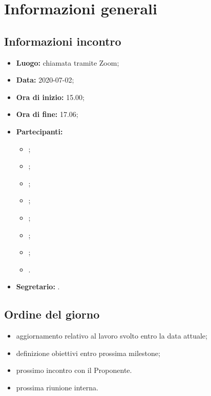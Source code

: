 \section{Informazioni generali}
\subsection{Informazioni incontro}
\begin{itemize}
	\item \textbf{Luogo:} chiamata tramite Zoom;
	\item \textbf{Data:} 2020-07-02;
	\item \textbf{Ora di inizio:} 15.00;
	\item \textbf{Ora di fine:} 17.06;
	\item \textbf{Partecipanti:}
		\begin{itemize}
			\item \VB;
			\item \LB;
			\item \NF;
			\item \EG;
			\item \FJ;
			\item \MP;
			\item \AS;
			\item \AZ.
		\end{itemize}
	\item \textbf{Segretario:} \LB.
\end{itemize}

\subsection{Ordine del giorno}
\begin{itemize}
	\item aggiornamento relativo al lavoro svolto entro la data attuale;
	\item definizione obiettivi entro prossima milestone;
	\item prossimo incontro con il Proponente.
	\item prossima riunione interna.
\end{itemize}
